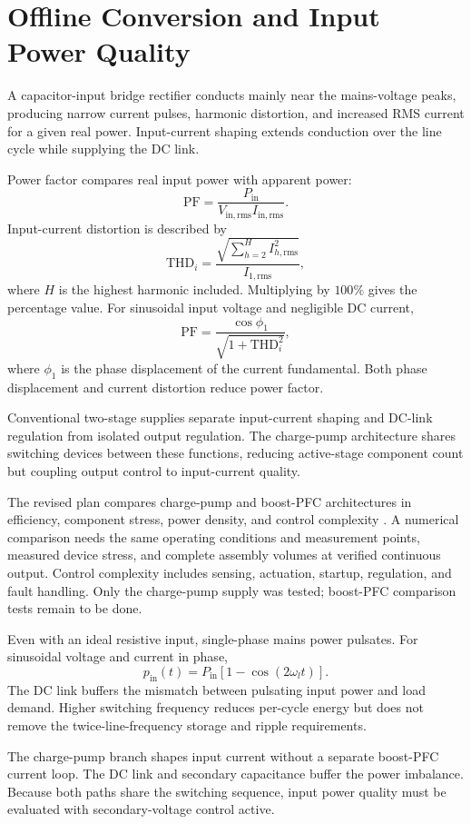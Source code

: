 \section{Offline Conversion and Input Power Quality}
\label{sec:bg-pfc}

A capacitor-input bridge rectifier conducts mainly near the mains-voltage peaks, producing narrow current pulses, harmonic distortion, and increased RMS current for a given real power. Input-current shaping extends conduction over the line cycle while supplying the DC link.

Power factor compares real input power with apparent power:
\begin{equation}
\mathrm{PF}=\frac{P_{\mathrm{in}}}{V_{\mathrm{in,rms}}I_{\mathrm{in,rms}}}.
\end{equation}
Input-current distortion is described by
\begin{equation}
\mathrm{THD}_i=\frac{\sqrt{\sum_{h=2}^{H}I_{h,\mathrm{rms}}^2}}{I_{1,\mathrm{rms}}},
\end{equation}
where \(H\) is the highest harmonic included. Multiplying by \(100\%\) gives the percentage value. For sinusoidal input voltage and negligible DC current,
\begin{equation}
\mathrm{PF}=\frac{\cos\phi_1}{\sqrt{1+\mathrm{THD}_i^2}},
\end{equation}
where \(\phi_1\) is the phase displacement of the current fundamental. Both phase displacement and current distortion reduce power factor.

Conventional two-stage supplies separate input-current shaping and DC-link regulation from isolated output regulation. The charge-pump architecture shares switching devices between these functions, reducing active-stage component count but coupling output control to input-current quality.

The revised plan compares charge-pump and boost-PFC architectures in efficiency, component stress, power density, and control complexity \cite{projectOctoberPlan}. A numerical comparison needs the same operating conditions and measurement points, measured device stress, and complete assembly volumes at verified continuous output. Control complexity includes sensing, actuation, startup, regulation, and fault handling. Only the charge-pump supply was tested; boost-PFC comparison tests remain to be done.

Even with an ideal resistive input, single-phase mains power pulsates. For sinusoidal voltage and current in phase,
\begin{equation}
p_{\mathrm{in}}(t)=P_{\mathrm{in}}\left[1-\cos(2\omega_l t)\right].
\end{equation}
The DC link buffers the mismatch between pulsating input power and load demand. Higher switching frequency reduces per-cycle energy but does not remove the twice-line-frequency storage and ripple requirements.

The charge-pump branch shapes input current without a separate boost-PFC current loop. The DC link and secondary capacitance buffer the power imbalance. Because both paths share the switching sequence, input power quality must be evaluated with secondary-voltage control active.
